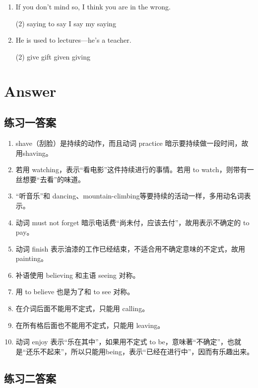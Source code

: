 \begin{enumerate}
\item If you don't mind \ttu so, I think you are in the wrong.
  \begin{tasks}(2)
    \task saying
    \task to say
    \task I say
    \task my saying
  \end{tasks}

\item He is used to \ttu lectures—he's a teacher.
  \begin{tasks}(2)
    \task give
    \task gift
    \task given
    \task giving
  \end{tasks}

\end{enumerate}

\section{Answer}
\subsection{练习一答案}
\begin{enumerate}
\item shave（刮脸）是持续的动作，而且动词 practice 暗示要持续做一段时间，故用shaving。
\item 若用 watching，表示“看电影”这件持续进行的事情。若用 to watch，则带有一丝想要“去看”的味道。
\item “听音乐”和 dancing、mountain-climbing等要持续的活动一样，多用动名词表示。
\item 动词 must not forget 暗示电话费“尚未付，应该去付”，故用表示不确定的 to pay。
\item 动词 finish 表示油漆的工作已经结束，不适合用不确定意味的不定式，故用painting。
\item 补语使用 believing 和主语 seeing 对称。
\item 用 to believe 也是为了和 to see 对称。
\item 在介词后面不能用不定式，只能用 calling。
\item 在所有格后面也不能用不定式，只能用 leaving。
\item 动词 enjoy 表示“乐在其中”，如果用不定式 to be，意味著“不确定”，也就是“还乐不起来”，所以只能用being，表示“已经在进行中”，因而有乐趣出来。
\end{enumerate}

\subsection{练习二答案}

